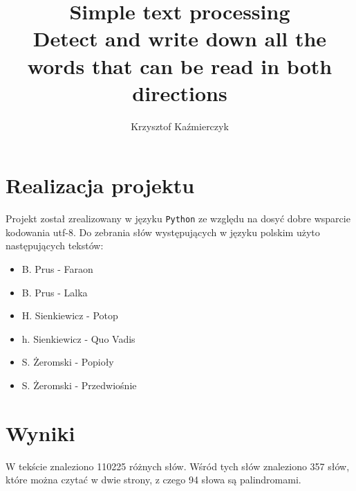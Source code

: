 \documentclass[a4paper,11pt]{article}
\author{Krzysztof Kaźmierczyk}
\title{Simple text processing \\ 
\large{Detect and write down all the words that can be read in both directions}}
\begin{document}
\maketitle 

\section{Realizacja projektu}
Projekt został zrealizowany w języku \texttt{Python} ze względu na dosyć dobre wsparcie kodowania utf-8. Do zebrania słów występujących w języku polskim użyto następujących tekstów:
\begin{itemize}
\item B. Prus - Faraon
\item B. Prus - Lalka
\item H. Sienkiewicz - Potop
\item h. Sienkiewicz - Quo Vadis
\item S. Żeromski - Popioły
\item S. Żeromski - Przedwiośnie
\end{itemize}


\section{Wyniki}
W tekście znaleziono 110225 różnych słów. Wśród tych słów znaleziono 357 słów, które można czytać w dwie strony, z czego 94 słowa są palindromami.
\end{document}
